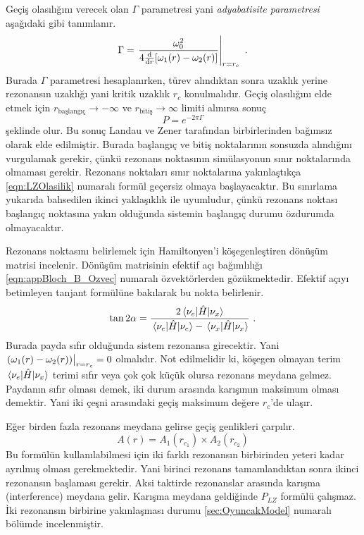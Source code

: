 Geçiş olasılığını verecek olan $ \Gamma $ parametresi yani \emph{adyabatisite parametresi} aşağıdaki gibi tanımlanır.
\begin{equation} \label{eqn:LZ_Gamma_def}
	\Gamma = \eval{\frac{\omega^{2}_{0}}{4 \dv{r} \qty[\omega_{1}(r)-\omega_{2}(r)]}}_{r=r_{c}} \text{ .}
\end{equation}
Burada $ \Gamma $ parametresi hesaplanırken, türev alındıktan sonra uzaklık yerine rezonansın uzaklığı yani kritik uzaklık $ r_{c} $ konulmalıdır. Geçiş olasılığını elde etmek için $ r_{\text{başlangıç}} \rightarrow -\infty $ ve $ r_{\text{bitiş}} \rightarrow \infty $ limiti alınırsa sonuç 
\begin{equation}\label{eqn:LZOlasilik}
	P = e^{-2\pi \Gamma}
\end{equation}
şeklinde olur. Bu sonuç Landau \cite{1571980074879151104} ve Zener \cite{1932RSPSA.137..696Z} tarafından birbirlerinden bağımsız olarak elde edilmiştir. Burada başlangıç ve bitiş noktalarının sonsuzda alındığını vurgulamak gerekir, çünkü rezonans noktasının simülasyonun sınır noktalarında olmaması gerekir. Rezonans noktaları sınır noktalarına yakınlaştıkça \eqref{eqn:LZOlasilik} numaralı formül geçersiz olmaya başlayacaktır. Bu sınırlama yukarıda bahsedilen ikinci yaklaşıklık ile uyumludur, çünkü rezonans noktası başlangıç noktasına yakın olduğunda sistemin başlangıç durumu özdurumda olmayacaktır.

Rezonans noktasını belirlemek için Hamiltonyen'i köşegenleştiren dönüşüm matrisi incelenir. Dönüşüm matrisinin efektif açı bağımlılığı \eqref{eqn:appBloch_B_Ozvec} numaralı özvektörlerden gözükmektedir. Efektif açıyı betimleyen tanjant formülüne bakılarak bu nokta belirlenir.
\begin{equation}
	\tan 2\alpha = \frac{2\mel{\nu_{e}}{\hat{H}}{\nu_{x}}}{\mel{\nu_{e}}{\hat{H}}{\nu_{e}} - \mel{\nu_{x}}{\hat{H}}{\nu_{x}}} \text{ .}
\end{equation}
Burada payda sıfır olduğunda sistem rezonansa girecektir. Yani $ \eval{\qty({\omega_{1}(r)-\omega_{2}(r)})}_{r=r_{c}} =0 $ olmalıdır. Not edilmelidir ki, köşegen olmayan terim $ \mel{\nu_{e}}{\hat{H}}{\nu_{x}} $ terimi sıfır veya çok çok küçük olursa rezonans meydana gelmez. Paydanın sıfır olması demek, iki durum arasında karışımın maksimum olması demektir. Yani iki çeşni arasındaki geçiş maksimum değere $ r_{c} $'de ulaşır.

Eğer birden fazla rezonans meydana gelirse geçiş genlikleri çarpılır.
\begin{equation}\label{eqn:LZamplitude}
	A(r) = A_{1}(r_{c_{1}}) \times A_{2}(r_{c_{2}})
\end{equation}
Bu formülün kullanılabilmesi için iki farklı rezonansın birbirinden yeteri kadar ayrılmış olması gerekmektedir. Yani birinci rezonans tamamlandıktan sonra ikinci rezonansın başlaması gerekir. Aksi taktirde rezonanslar arasında karışma (interference) meydana gelir. Karışma meydana geldiğinde $ P_{LZ} $ formülü çalışmaz. İki rezonansın birbirine yakınlaşması durumu \ref{sec:OyuncakModel} numaralı bölümde incelenmiştir.

